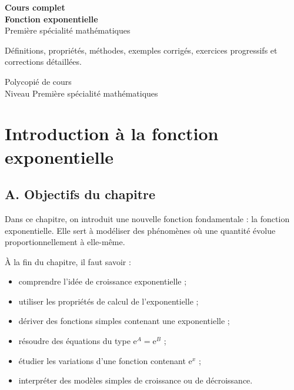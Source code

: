 \documentclass[11pt,a4paper]{article}
\newcounter{corr}
\newcommand{\e}{\mathrm{e}}
\begin{document}
\begin{titlepage}
\centering
\vspace*{2cm}

{\Huge \textbf{Cours complet}}\\[0.4cm]
{\LARGE \textbf{Fonction exponentielle}}\\[0.4cm]
{\Large Première spécialité mathématiques}\\[1cm]

\begin{tcolorbox}[colback=blue!5,colframe=bleu,width=0.85\textwidth]
\centering
\Large
Définitions, propriétés, méthodes, exemples corrigés, exercices progressifs et corrections détaillées.
\end{tcolorbox}

\vfill

{\large Polycopié de cours}\\
{\large Niveau Première spécialité mathématiques}

\vfill
\end{titlepage}

\tableofcontents
\newpage

\section{Introduction à la fonction exponentielle}

\subsection*{A. Objectifs du chapitre}

Dans ce chapitre, on introduit une nouvelle fonction fondamentale : la fonction exponentielle. Elle sert à modéliser des phénomènes où une quantité évolue proportionnellement à elle-même.

À la fin du chapitre, il faut savoir :
\begin{itemize}
    \item comprendre l'idée de croissance exponentielle ;
    \item utiliser les propriétés de calcul de l'exponentielle ;
    \item dériver des fonctions simples contenant une exponentielle ;
    \item résoudre des équations du type $\e^A=\e^B$ ;
    \item étudier les variations d'une fonction contenant $\e^x$ ;
    \item interpréter des modèles simples de croissance ou de décroissance.
\end{itemize}
\end{document}
